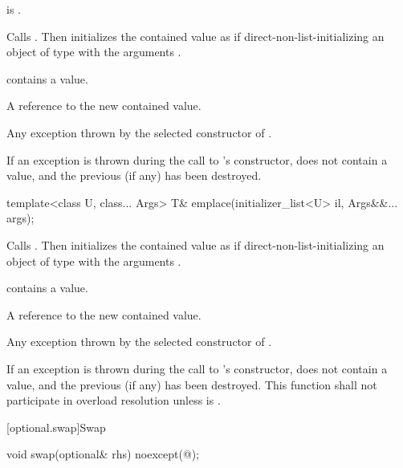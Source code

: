 \begin{itemdescr}
\pnum
\requires
{} is .

\pnum
\effects
Calls . Then initializes the contained value as if direct-non-list-initializing an object of type  with the arguments .

\pnum
\postconditions
{} contains a value.

\pnum
\returns
A reference to the new contained value.

\pnum
\throws
Any exception thrown by the selected constructor of .

\pnum
\remarks
If an exception is thrown during the call to 's constructor,  does not contain a value, and the previous  (if any) has been destroyed.
\end{itemdescr}

%
\begin{itemdecl}
template<class U, class... Args> T& emplace(initializer_list<U> il, Args&&... args);
\end{itemdecl}

\begin{itemdescr}
\pnum
\effects
Calls . Then initializes the contained value as if direct-non-list-initializing an object of type  with the arguments .

\pnum
\postconditions
{} contains a value.

\pnum
\returns
A reference to the new contained value.

\pnum
\throws
Any exception thrown by the selected constructor of .

\pnum
\remarks
If an exception is thrown during the call to 's constructor,  does not contain a value, and the previous  (if any) has been destroyed.
This function shall not participate in overload resolution unless  is .
\end{itemdescr}

[optional.swap]{Swap}

%
\begin{itemdecl}
void swap(optional& rhs) noexcept(@\seebelow@);
\end{itemdecl}

